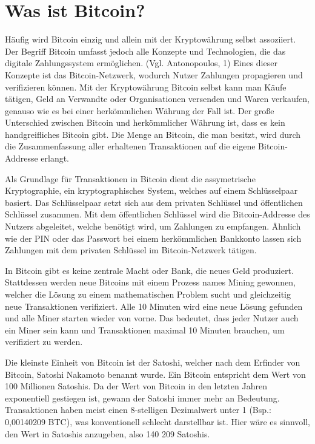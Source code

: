 \section{Was ist Bitcoin?}
Häufig wird Bitcoin einzig und allein mit der Kryptowährung selbst assoziiert. Der Begriff Bitcoin umfasst jedoch alle 
Konzepte und Technologien, die das digitale Zahlungssystem ermöglichen. (Vgl. Antonopoulos, 1) Eines dieser Konzepte ist das Bitcoin-Netzwerk, wodurch
Nutzer Zahlungen propagieren und verifizieren können. Mit der Kryptowährung Bitcoin selbst kann man Käufe tätigen, Geld an 
Verwandte oder Organisationen versenden und Waren verkaufen, genauso wie es bei einer herkömmlichen Währung der Fall ist. Der 
große Unterschied zwischen Bitcoin und herkömmlicher Währung ist, dass es kein handgreifliches Bitcoin gibt. Die Menge an 
Bitcoin, die man besitzt, wird durch die Zusammenfassung aller erhaltenen Transaktionen auf die eigene Bitcoin-Addresse erlangt. 

Als Grundlage für Transaktionen in Bitcoin dient die assymetrische Kryptographie, ein kryptographisches System, welches auf
einem Schlüsselpaar basiert. Das Schlüsselpaar setzt sich aus dem privaten Schlüssel und öffentlichen Schlüssel zusammen. Mit 
dem öffentlichen Schlüssel wird die Bitcoin-Addresse des Nutzers abgeleitet, welche benötigt wird, um Zahlungen zu empfangen. 
Ähnlich wie der PIN oder das Passwort bei einem herkömmlichen Bankkonto lassen sich Zahlungen mit dem privaten Schlüssel 
im Bitcoin-Netzwerk tätigen.

In Bitcoin gibt es keine zentrale Macht oder Bank, die neues Geld produziert. Stattdessen werden neue Bitcoins mit einem Prozess
names Mining gewonnen, welcher die Lösung zu einem mathematischen Problem sucht und gleichzeitig neue Transaktionen verifiziert.
Alle 10 Minuten wird eine neue Lösung gefunden und alle Miner starten wieder von vorne. Das bedeutet, dass jeder Nutzer auch ein
Miner sein kann und Transaktionen maximal 10 Minuten brauchen, um verifiziert zu werden.

Die kleinste Einheit von Bitcoin ist der Satoshi, welcher nach dem Erfinder von Bitcoin, Satoshi Nakamoto benannt wurde. Ein 
Bitcoin entspricht dem Wert von 100 Millionen Satoshis. Da der Wert von Bitcoin in den letzten Jahren exponentiell gestiegen ist,
gewann der Satoshi immer mehr an Bedeutung. Transaktionen haben meist einen 8-stelligen Dezimalwert unter 1 (Bsp.: 0,00140209 BTC),
was konventionell schlecht darstellbar ist. Hier wäre es sinnvoll, den Wert in Satoshis anzugeben, also 140 209 Satoshis.


